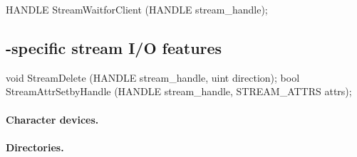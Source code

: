\begin{paldef}
HANDLE StreamWaitforClient (HANDLE stream_handle);
\end{paldef} 


\subsection*{\graphene{}-specific stream I/O features}

\begin{paldef}
void StreamDelete (HANDLE stream_handle, uint direction);
bool StreamAttrSetbyHandle (HANDLE stream_handle,
                            STREAM_ATTRS attrs);
\end{paldef}



\paragraph{Character devices.}



\paragraph{Directories.}